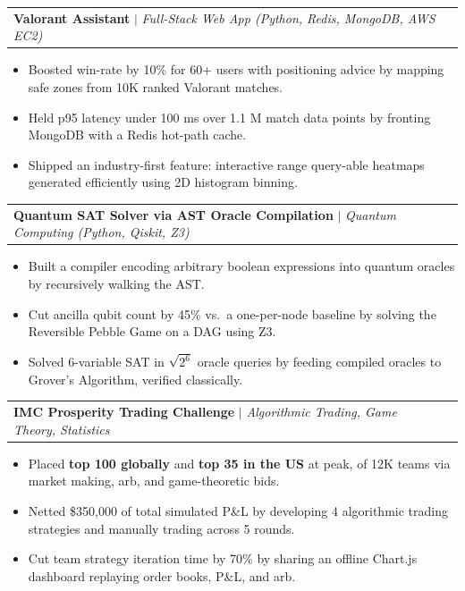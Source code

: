 \documentclass[letterpaper,10pt]{article}
\makeatletter
\newcommand{\resumeItem}[1]{
  \item\small{#1 \vspace{-2pt}}
}
\newcommand{\resumeProjectHeading}[2]{
    \item
    \begin{tabular*}{0.97\textwidth}{l@{\extracolsep{\fill}}r}
      \small#1 & #2 \\
    \end{tabular*}\vspace{-7pt}
}
\newcommand{\resumeItemListStart}{\begin{itemize}}
\newcommand{\resumeItemListEnd}{\end{itemize}\vspace{-5pt}}
\makeatother
\begin{document}
      
    \resumeProjectHeading
      {\textbf{Valorant Assistant} $|$ \emph{Full-Stack Web App (Python, Redis, MongoDB, AWS EC2)}}{}
      \resumeItemListStart
        \resumeItem{Boosted win-rate by 10\% for 60+ users with positioning advice by mapping safe zones
          from 10K ranked Valorant matches.}
        \resumeItem{Held p95 latency under 100 ms over 1.1 M match data points by fronting MongoDB
          with a Redis hot-path cache.}
        \resumeItem{Shipped an industry-first  feature: interactive range query-able heatmaps generated efficiently using 2D histogram binning.}
    
      \resumeItemListEnd

    \resumeProjectHeading
      {\textbf{Quantum SAT Solver via AST Oracle Compilation} $|$ \emph{Quantum Computing (Python, Qiskit, Z3)}}{}
      \resumeItemListStart
        \resumeItem{Built a compiler encoding arbitrary boolean expressions into quantum oracles
          by recursively walking the AST.}
        \resumeItem{Cut ancilla qubit count by 45\% vs.\ a one-per-node baseline by solving the Reversible
          Pebble Game on a DAG using Z3.}
        \resumeItem{Solved 6-variable SAT in $\sqrt{2^6}$ oracle queries by feeding compiled oracles
          to Grover's Algorithm, verified classically.}
      \resumeItemListEnd

    \resumeProjectHeading
      {\textbf{IMC Prosperity Trading Challenge} $|$ \emph{Algorithmic Trading, Game Theory, Statistics}}{}
      \resumeItemListStart
        \resumeItem{Placed \textbf{top 100 globally} and \textbf{top 35 in the US} at peak, of 12K teams
          via market making, arb, and game-theoretic bids.}
        \resumeItem{Netted \$350,000 of total simulated P\&L by developing 4 algorithmic trading strategies and manually trading across 5 rounds.}
        \resumeItem{Cut team strategy iteration time by 70\% by sharing an offline Chart.js dashboard replaying
          order books, P\&L, and arb.}
      \resumeItemListEnd
\end{document}

